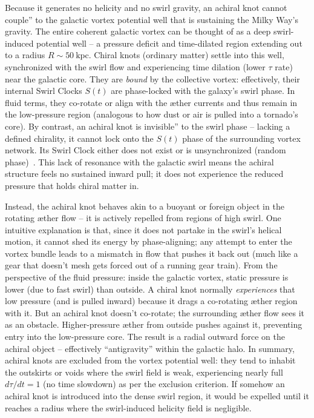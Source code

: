 \documentclass[11pt]{article}
\begin{document}
Because it generates no helicity and no swirl gravity, an achiral knot cannot couple'' to the galactic vortex potential well that is sustaining the Milky Way's gravity. The entire coherent galactic vortex can be thought of as a deep swirl-induced potential well -- a pressure deficit and time-dilated region extending out to a radius $R \sim 50~\text{kpc}$. Chiral knots (ordinary matter) settle into this well, synchronized with the swirl flow and experiencing time dilation (lower $\tau$ rate) near the galactic core. They are \textit{bound} by the collective vortex: effectively, their internal Swirl Clocks $S(t)$ are phase-locked with the galaxy's swirl phase. In fluid terms, they co-rotate or align with the \ae ther currents and thus remain in the low-pressure region (analogous to how dust or air is pulled into a tornado's core). By contrast, an achiral knot is invisible'' to the swirl phase -- lacking a defined chirality, it cannot lock onto the $S(t)$ phase of the surrounding vortex network. Its Swirl Clock either does not exist or is unsynchronized (random phase)~\cite{iskandarani2025vam1}. This lack of resonance with the galactic swirl means the achiral structure feels no sustained inward pull; it does not experience the reduced pressure that holds chiral matter in.

Instead, the achiral knot behaves akin to a buoyant or foreign object in the rotating \ae ther flow -- it is actively repelled from regions of high swirl. One intuitive explanation is that, since it does not partake in the swirl's helical motion, it cannot shed its energy by phase-aligning; any attempt to enter the vortex bundle leads to a mismatch in flow that pushes it back out (much like a gear that doesn't mesh gets forced out of a running gear train). From the perspective of the fluid pressure: inside the galactic vortex, static pressure is lower (due to fast swirl) than outside. A chiral knot normally \textit{experiences} that low pressure (and is pulled inward) because it drags a co-rotating \ae ther region with it. But an achiral knot doesn't co-rotate; the surrounding \ae ther flow sees it as an obstacle. Higher-pressure \ae ther from outside pushes against it, preventing entry into the low-pressure core. The result is a radial outward force on the achiral object -- effectively ``antigravity'' within the galactic halo. In summary, achiral knots are excluded from the vortex potential well: they tend to inhabit the outskirts or voids where the swirl field is weak, experiencing nearly full $d\tau/dt=1$ (no time slowdown) as per the exclusion criterion. If somehow an achiral knot is introduced into the dense swirl region, it would be expelled until it reaches a radius where the swirl-induced helicity field is negligible.
\end{document}
